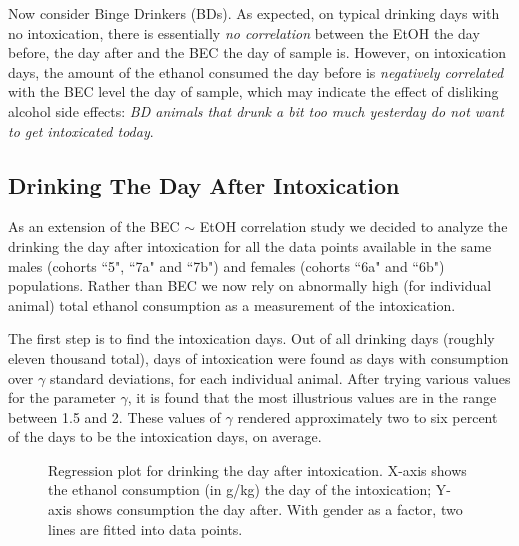 	Now consider Binge Drinkers (BDs). As expected, on typical drinking days with no intoxication, there is essentially \textit{no correlation} between the EtOH the day before, the day after and the BEC the day of sample is. However, on intoxication days, the amount of the ethanol consumed the day before is \textit{negatively correlated} with the BEC level the day of sample, which may indicate the effect of disliking alcohol side effects: \textit{BD animals that drunk a bit too much yesterday do not want to get intoxicated today}. 
	
	\subsection{Drinking The Day After Intoxication}
	As an extension of the BEC $\sim$ EtOH correlation study we decided to analyze the drinking the day after intoxication for all the data points available in the same males (cohorts ``5", ``7a" and ``7b") and females (cohorts ``6a" and ``6b") populations. Rather than BEC we now rely on abnormally high (for individual animal) total ethanol consumption as a measurement of the intoxication. 
	
	The first step is to find the intoxication days. Out of all drinking days (roughly eleven thousand total), days of intoxication were found as days with consumption over $\gamma$ standard deviations, for each individual animal. After trying various values for the parameter $\gamma$, it is found that the most illustrious values are in the range between 1.5 and 2. These values of $\gamma$ rendered approximately two to six percent of the days to be the intoxication days, on average.
	
	\begin{figure}[ht]
		\centering
		\caption{Regression plot for drinking the day after intoxication. X-axis shows the ethanol consumption (in g/kg) the day of the intoxication; Y-axis shows consumption the day after. With gender as a factor, two lines are fitted into data points.}
		\label{fig:intox-poly-reg}
	\end{figure}
		
